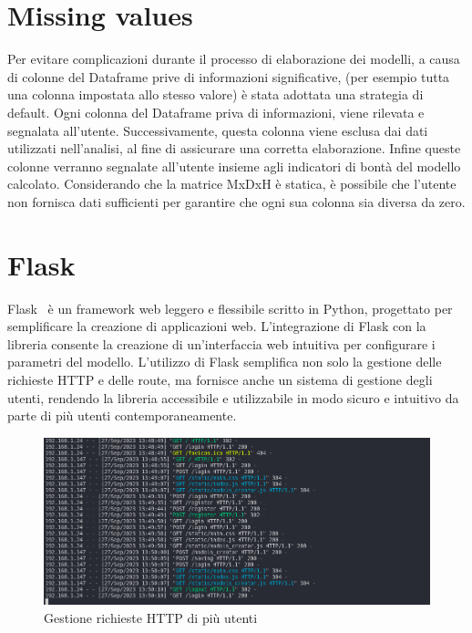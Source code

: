 \documentclass{rapportECL}
\begin{document}
\section{Missing values}

Per evitare complicazioni durante il processo di elaborazione dei modelli, a causa di colonne del Dataframe prive di informazioni significative,
(per esempio tutta una colonna impostata allo stesso valore) è stata adottata una strategia di default. Ogni colonna del Dataframe priva di informazioni, 
viene rilevata e segnalata all'utente. Successivamente, questa colonna viene esclusa dai dati utilizzati nell'analisi, al fine di assicurare una corretta 
elaborazione. Infine queste colonne verranno segnalate all'utente insieme agli indicatori di bontà del modello calcolato. 
Considerando che la matrice MxDxH è statica, è possibile che l'utente non fornisca dati sufficienti per garantire che ogni sua colonna sia diversa da zero. 


\section{Flask}
  Flask~\cite{flask} è un framework web leggero e flessibile scritto in Python, progettato per semplificare la creazione di applicazioni web. 
  L'integrazione di Flask con la libreria consente la creazione di un'interfaccia web intuitiva per configurare i parametri del modello. L'utilizzo di 
  Flask semplifica non solo la gestione delle richieste HTTP e delle route, ma fornisce anche un sistema di gestione degli utenti, rendendo la libreria 
  accessibile e utilizzabile in modo sicuro e intuitivo da parte di più utenti contemporaneamente.

  \begin{figure}[htp]
    \centering
    \includegraphics[width=1\textwidth]{images/img7.png}
    \caption{Gestione richieste HTTP di più utenti}
  \end{figure}
\end{document}

